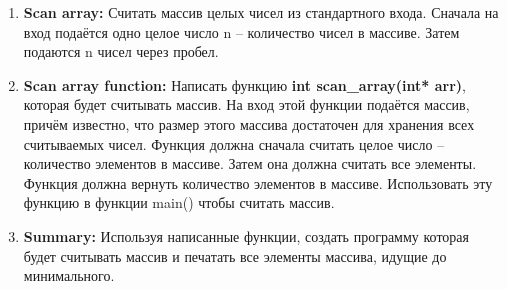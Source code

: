 \documentclass{article}
\begin{document}
\begin{enumerate}
\item \textbf{Scan array:} Считать массив целых чисел из стандартного входа. Сначала на вход подаётся одно целое число n -- количество чисел в массиве. Затем подаются n чисел через пробел.
 
\item \textbf{Scan array function:} Написать функцию \textbf{int scan\_array(int* arr)}, которая будет считывать массив. На вход этой функции подаётся массив, причём известно, что размер этого массива достаточен для хранения всех считываемых чисел. Функция должна сначала считать целое число -- количество элементов в массиве. Затем она должна считать все элементы. Функция должна вернуть количество элементов в массиве. Использовать эту функцию в функции main() чтобы считать массив.

\item \textbf{Summary:} Используя написанные функции, создать программу которая будет считывать массив и печатать все элементы массива, идущие до минимального.



\end{enumerate}
\end{document}
